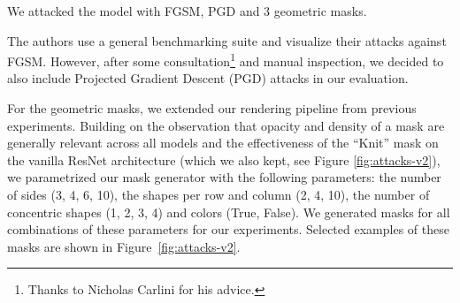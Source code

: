 \documentclass[a4paper, oneside]{discothesis}
\begin{document}
We attacked the model with FGSM, PGD and 3 geometric masks.

The authors use a general benchmarking suite and visualize their attacks against FGSM. However, after some consultation\footnote{Thanks to Nicholas Carlini for his advice.} and manual inspection, we decided to also include Projected Gradient Descent (PGD) attacks in our evaluation.

For the geometric masks, we extended our rendering pipeline from previous experiments. Building on the observation that opacity and density of a mask are generally relevant across all models and the effectiveness of the ``Knit'' mask on the vanilla ResNet architecture (which we also kept, see Figure \ref{fig:attacks-v2}), we parametrized our mask generator with the following parameters: the number of sides (3, 4, 6, 10), the shapes per row and column (2, 4, 10), the number of concentric shapes (1, 2, 3, 4) and colors (True, False). We generated masks for all combinations of these parameters for our experiments. Selected examples of these masks are shown in Figure~\ref{fig:attacks-v2}.
\end{document}
